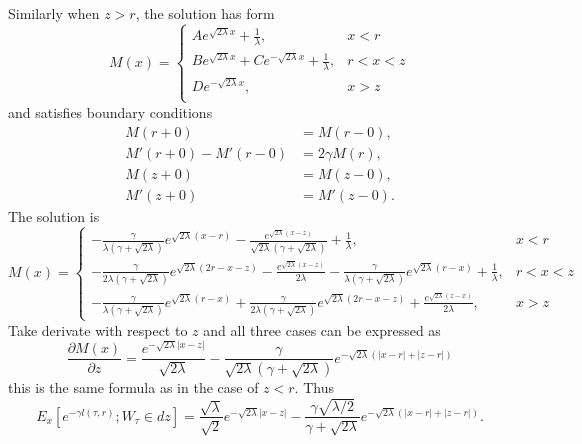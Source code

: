 Similarly when $z>r$, the solution has form
\[
  M(x)= 
    \begin{cases}
      A e^{\sqrt{2\lambda} x} + \frac{1}{\lambda}, &x<r  \\
      B e^{\sqrt{2\lambda} x} + C e^{-\sqrt{2\lambda} x} + \frac{1}{\lambda},
        &r<x<z   \\
      D e^{-\sqrt{2\lambda} x},  &x>z  \\
    \end{cases}
\]
and satisfies boundary conditions
\begin{align*}
  M(r+0) &= M(r-0), \\
  M'(r+0) - M'(r-0) &= 2\gamma M(r), \\
  M(z+0) &= M(z-0),  \\
  M'(z+0) &= M'(z-0). 
\end{align*}
The solution is
\[
  M(x)= 
    \begin{cases}
      -\frac{\gamma}{\lambda(\gamma+\sqrt{2\lambda})} e^{\sqrt{2\lambda}(x-r)}
      - \frac{e^{\sqrt{2\lambda}(x-z)}}{\sqrt{2\lambda}(\gamma+\sqrt{2\lambda})}
        + \frac{1}{\lambda},
      &x<r \\
      -\frac{\gamma}{2\lambda(\gamma+\sqrt{2\lambda})}
        e^{\sqrt{2\lambda}(2r-x-z)} - \frac{e^{\sqrt{2\lambda}(x-z)}}{2\lambda}
      -\frac{\gamma}{\lambda(\gamma+\sqrt{2\lambda})} e^{\sqrt{2\lambda}(r-x)}
        + \frac{1}{\lambda},
      &r<x<z \\
      -\frac{\gamma}{\lambda(\gamma+\sqrt{2\lambda})} e^{\sqrt{2\lambda}(r-x)}
      +\frac{\gamma}{2\lambda(\gamma+\sqrt{2\lambda})}
        e^{\sqrt{2\lambda}(2r-x-z)} + \frac{e^{\sqrt{2\lambda}(z-x)}}{2\lambda},
      &x>z
    \end{cases}
\]
Take derivate with respect to $z$ and all three cases can be expressed as
\[
  \frac{\partial M(x)}{\partial z} 
    = \frac{e^{-\sqrt{2\lambda} |x-z|} }{\sqrt{2\lambda}}
      - \frac{\gamma}{\sqrt{2\lambda} (\gamma+\sqrt{2\lambda})}
        e^{ -\sqrt{2\lambda} (|x-r|+|z-r|) }
\]
this is the same formula as in the case of $z<r$.
Thus 
\begin{equation} \label{E:H1.1.3.5}
  E_x[ e^{-\gamma l(\tau,r)}; W_{\tau}\in dz ]
  = \frac{\sqrt{\lambda}}{\sqrt{2}} e^{-\sqrt{2\lambda} |x-z|}
    - \frac{\gamma \sqrt{\lambda/2} }{ \gamma+\sqrt{2\lambda} }
      e^{ -\sqrt{2\lambda} (|x-r|+|z-r|) }.
\end{equation}

